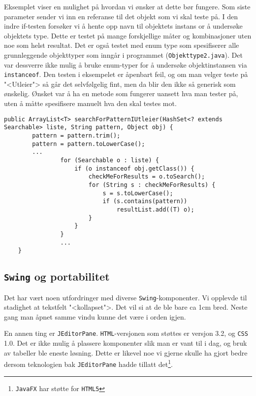 Eksemplet viser en mulighet på hvordan vi ønsker at dette bør fungere. Som siste parameter sender vi inn en referanse til det objekt som vi skal teste på. I den indre if-testen forsøker vi å hente opp navn til objektets instans or å undersøke objektets type. Dette er testet på mange forskjellige måter og kombinasjoner uten noe som helst resultat. 
Det er også testet med enum type som spesifiserer alle grunnleggende objekttyper som inngår i programmet (\texttt{Objekttype2.java}). 
Det var dessverre ikke mulig å bruke enum-typer for å undersøke objektinstansen via \texttt{instanceof}. Den testen i eksempelet er åpenbart feil, og om man velger teste på "<Utleier"> så går det selvfølgelig fint, men da blir den ikke så generisk som ønskelig. Ønsket var å ha en metode som fungerer uansett hva man tester på, uten å måtte spesifisere manuelt hva den skal testes mot.


\begin{lstlisting}[caption=Problem med å teste for objekttype (rad 6)., label=kode:objekttype]
    public ArrayList<T> searchForPatternIUtleier(HashSet<? extends Searchable> liste, String pattern, Object obj) {
        pattern = pattern.trim();
        pattern = pattern.toLowerCase();
        ...
                for (Searchable o : liste) {
                    if (o instanceof obj.getClass()) {
                        checkMeForResults = o.toSearch();
                        for (String s : checkMeForResults) {
                            s = s.toLowerCase();
                            if (s.contains(pattern))
                                resultList.add((T) o);
                        }
                    }
                }     
                ...
    }
\end{lstlisting}




\subsection{\texttt{Swing} og portabilitet} \label{subsec:portabilitet}
Det har vært noen utfordringer med diverse \texttt{Swing}-komponenter. Vi opplevde til stadighet at tekstfelt "<kollapset">. Det vil si at de ble bare ca 1cm bred. Neste gang man åpnet samme vindu kunne det være i orden igjen. 

En annen ting er \texttt{JEditorPane}. \texttt{HTML}-versjonen som støttes er versjon 3.2, og \texttt{CSS} 1.0. 
Det er ikke mulig å plassere komponenter slik man er vant til i dag, og bruk av tabeller ble eneste løsning. Dette er likevel noe vi gjerne skulle ha gjort bedre dersom teknologien bak \texttt{JEditorPane} hadde tillatt det\footnote{\texttt{JavaFX} har støtte for \texttt{HTML5}}.

